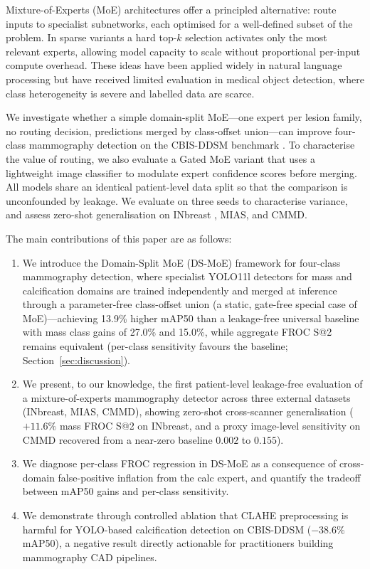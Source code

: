\documentclass[runningheads]{llncs}
\begin{document}
Mixture-of-Experts (MoE) architectures \cite{jacobs1991adaptive} offer
a principled alternative: route inputs to specialist subnetworks, each
optimised for a well-defined subset of the problem. In sparse variants
\cite{shazeer2017outrageously} a hard top-$k$ selection activates only
the most relevant experts, allowing model capacity to scale without
proportional per-input compute overhead. These ideas have been applied
widely in natural language processing but have received limited
evaluation in medical object detection, where class heterogeneity is
severe and labelled data are scarce.

We investigate whether a simple domain-split MoE---one expert per
lesion family, no routing decision, predictions merged by class-offset
union---can improve four-class mammography detection on the CBIS-DDSM
benchmark \cite{lee2017curated}. To characterise the value of routing,
we also evaluate a Gated MoE variant that uses a lightweight image
classifier to modulate expert confidence scores before merging. All
models share an identical patient-level data split so that the
comparison is unconfounded by leakage. We evaluate on three seeds to
characterise variance, and assess zero-shot generalisation on INbreast
\cite{moreira2012inbreast}, MIAS, and CMMD.

The main contributions of this paper are as follows:
\begin{enumerate}
\setlength{\itemsep}{0pt}
\setlength{\parskip}{0pt}
\item We introduce the Domain-Split MoE (DS-MoE) framework for
  four-class mammography detection, where specialist YOLO11l detectors
  for mass and calcification domains are trained independently and merged
  at inference through a parameter-free class-offset union (a static,
  gate-free special case of MoE)---achieving 13.9\% higher mAP50 than a
  leakage-free universal baseline with mass class gains of 27.0\% and
  15.0\%, while aggregate FROC S@2 remains equivalent (per-class
  sensitivity favours the baseline; Section~\ref{sec:discussion}).
\item We present, to our knowledge, the first patient-level
  leakage-free evaluation of a mixture-of-experts mammography detector
  across three external datasets (INbreast, MIAS, CMMD), showing
  zero-shot cross-scanner generalisation ($+11.6\%$ mass FROC S@2 on
  INbreast, and a proxy image-level sensitivity on CMMD recovered from a
  near-zero baseline $0.002$ to $0.155$).
\item We diagnose per-class FROC regression in DS-MoE as a consequence
  of cross-domain false-positive inflation from the calc expert, and
  quantify the tradeoff between mAP50 gains and per-class sensitivity.
\item We demonstrate through controlled ablation that CLAHE preprocessing
  is harmful for YOLO-based calcification detection on CBIS-DDSM
  ($-38.6\%$ mAP50), a negative result directly actionable for
  practitioners building mammography CAD pipelines.
\end{enumerate}
\end{document}
